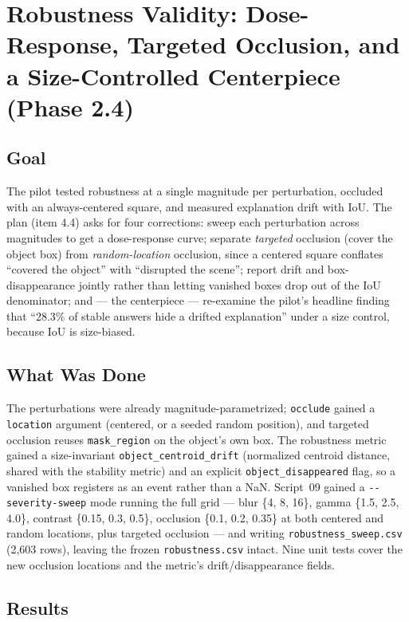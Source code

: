 \chapter{Robustness Validity: Dose-Response, Targeted Occlusion, and a Size-Controlled Centerpiece (Phase 2.4)}
\label{chap:p2-4}

\section{Goal}

The pilot tested robustness at a single magnitude per perturbation, occluded with an always-centered
square, and measured explanation drift with IoU. The plan (item 4.4) asks for four corrections: sweep
each perturbation across magnitudes to get a dose-response curve; separate \emph{targeted} occlusion
(cover the object box) from \emph{random-location} occlusion, since a centered square conflates
``covered the object'' with ``disrupted the scene''; report drift and box-disappearance jointly rather
than letting vanished boxes drop out of the IoU denominator; and --- the centerpiece --- re-examine the
pilot's headline finding that ``28.3\% of stable answers hide a drifted explanation'' under a size
control, because IoU is size-biased.

\section{What Was Done}

The perturbations were already magnitude-parametrized; \texttt{occlude} gained a \texttt{location}
argument (centered, or a seeded random position), and targeted occlusion reuses
\texttt{mask\_region} on the object's own box. The robustness metric gained a size-invariant
\texttt{object\_centroid\_drift} (normalized centroid distance, shared with the stability metric) and an
explicit \texttt{object\_disappeared} flag, so a vanished box registers as an event rather than a NaN.
Script~09 gained a \texttt{-{}-severity-sweep} mode running the full grid --- blur \{4, 8, 16\}, gamma
\{1.5, 2.5, 4.0\}, contrast \{0.15, 0.3, 0.5\}, occlusion \{0.1, 0.2, 0.35\} at both centered and
random locations, plus targeted occlusion --- and writing \texttt{robustness\_sweep.csv} (2{,}603
rows), leaving the frozen \texttt{robustness.csv} intact. Nine unit tests cover the new occlusion
locations and the metric's drift/disappearance fields.

\section{Results}

